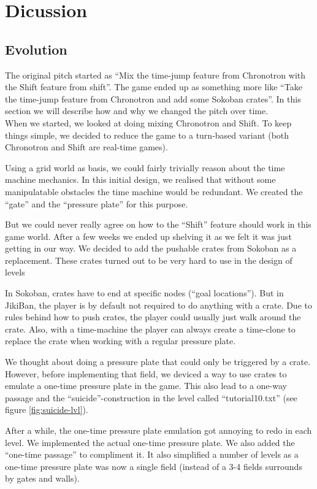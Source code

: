 \section{Dicussion}

\subsection{Evolution}
The original pitch started as ``Mix the time-jump feature from
Chronotron with the Shift feature from shift''.  The game ended up as
something more like ``Take the time-jump feature from Chronotron and
add some Sokoban crates''.  In this section we will describe how and why
we changed the pitch over time.\\


When we started, we looked at doing mixing Chronotron and Shift.  To
keep things simple, we decided to reduce the game to a turn-based
variant (both Chronotron and Shift are real-time games).

Using a grid world as basis, we could fairly trivially reason about
the time machine mechanics.  In this initial design, we realised that
without some manipulatable obstacles the time machine would be
redundant.  We created the ``gate'' and the ``pressure plate'' for
this purpose.

But we could never really agree on how to the ``Shift'' feature should
work in this game world.  After a few weeks we ended up shelving it as
we felt it was just getting in our way.  We decided to add the
pushable crates from Sokoban as a replacement.  These crates turned out
to be very hard to use in the design of levels

In Sokoban, crates have to end at specific nodes (``goal locations'').
But in JikiBan, the player is by default not required to do anything
with a crate.  Due to rules behind how to push crates, the player
could usually just walk around the crate.  Also, with a time-machine
the player can always create a time-clone to replace the crate when
working with a regular pressure plate.

We thought about doing a pressure plate that could only be triggered
by a crate.  However, before implementing that field, we deviced a way
to use crates to emulate a one-time pressure plate in the game.  This
also lead to a one-way passage and the ``suicide''-construction in the
level called ``tutorial10.txt'' (see figure \ref{fig:suicide-lvl}).

After a while, the one-time pressure plate emulation got annoying to
redo in each level.  We implemented the actual one-time pressure
plate. We also added the ``one-time passage'' to compliment it.  It
also simplified a number of levels as a one-time pressure plate was
now a single field (instead of a 3-4 fields surrounds by gates and
walls).


